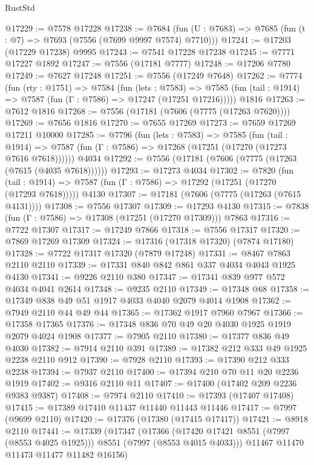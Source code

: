 \begin{lexlean}{RustStd}
\begin{coremodule}
{\begin{coremodule}
{{{{{{{{{{{{{{{{{{{{{{{{{{{{{{{{{{{{{{{{{{{@17229 := @7578 @17228
@17238 := @7684 (fun (U : @7683) => @7685 (fun (t : @7) => @7693 (@7556 (@7699 @9997 @7574) @7710)))
@17241 := @17203 (@17229 @17238) @9995
@17243 := @7541 @17228 @17238
@17245 := @7771 @17227 @1892
@17247 := @7556 (@17181 @7777)
@17248 := @17206 @7780
@17249 := @7627 @17248
@17251 := @7556 (@17249 @7648)
@17262 := @7774
    (fun (rty : @1751) =>
    @7584
      (fun (lets : @7583) =>
      @7585 (fun (tail : @1914) => @7587 (fun (Γ : @7586) => @17247 (@17251 @17216)))))
    @1816
@17263 := @7612 @1816
@17268 := @7556 (@17181 (@7606 (@7775 (@17263 @7620))))
@17269 := @7656 @1816
@17270 := @7655 @17269
@17273 := @7659 @17269 @17211 @10000
@17285 := @7796
    (fun (lets : @7583) =>
    @7585
      (fun (tail : @1914) =>
      @7587 (fun (Γ : @7586) => @17268 (@17251 (@17270 (@17273 @7616 @7618))))))
    @4034
@17292 := @7556 (@17181 (@7606 (@7775 (@17263 (@7615 (@4035 @7618))))))
@17293 := @17273 @4034
@17302 := @7820
    (fun (tail : @1914) => @7587 (fun (Γ : @7586) => @17292 (@17251 (@17270 (@17293 @7618)))))
    @4130
@17307 := @17181 (@7606 (@7775 (@17263 (@7615 @4131))))
@17308 := @7556 @17307
@17309 := @17293 @4130
@17315 := @7838 (fun (Γ : @7586) => @17308 (@17251 (@17270 @17309))) @7863
@17316 := @7722 @17307
@17317 := @17249 @7866
@17318 := @7556 @17317
@17320 := @7869 @17269 @17309
@17324 := @17316 (@17318 @17320) (@7874 @17180)
@17328 := @7722 @17317 @17320 (@7879 @17248)
@17331 := @8467 @7863 @2110 @2110
@17339 := @17331 @840 @842 @861 @337 @4034 @4043 @1925 @4130
@17341 := @9226 @2110 @380
@17347 := @17341 @839 @977 @572 @4034 @4041 @2614
@17348 := @9235 @2110
@17349 := @17348 @68
@17358 := @17349 @838 @49 @51 @1917 @4033 @4040 @2079 @4014 @1908
@17362 := @7949 @2110 @44 @49 @44
@17365 := @17362 @1917 @7960 @7967
@17366 := @17358 @17365
@17376 := @17348 @836 @70 @49 @20 @4030 @1925 @1919 @2079 @4024 @1908
@17377 := @7905 @2110
@17380 := @17377 @836 @49 @4030
@17382 := @7914 @2110 @391
@17389 := @17382 @212 @333 @49 @1925 @2238 @2110 @912
@17390 := @7928 @2110
@17393 := @17390 @212 @333 @2238
@17394 := @7937 @2110
@17400 := @17394 @210 @70 @11 @20 @2236 @1919
@17402 := @9316 @2110 @11
@17407 := @17400 (@17402 @209 @2236 @9383 @9387)
@17408 := @7974 @2110
@17410 := @17393 (@17407 @17408)
@17415 := @17389 @17410 @11437 @11440 @11443 @11446
@17417 := @7997 (@9699 @2110)
@17420 := @17376 (@17380 (@17415 @17417))
@17421 := @8918 @2110
@17441 := @17339
    (@17347
      (@17366 (@17420 @17421 @8551 (@7997 (@8553 @4025 @1925))) @8551 (@7997 (@8553 @4015 @4033)))
      @11467
      @11470
      @11473
      @11477
      @11482
      @16156)
}}}}}}}}}}}}}}}}}}}}}}}}}}}}}}}}}}}}}}}}}}}
\end{coremodule}}
\end{coremodule}
\end{lexlean}
